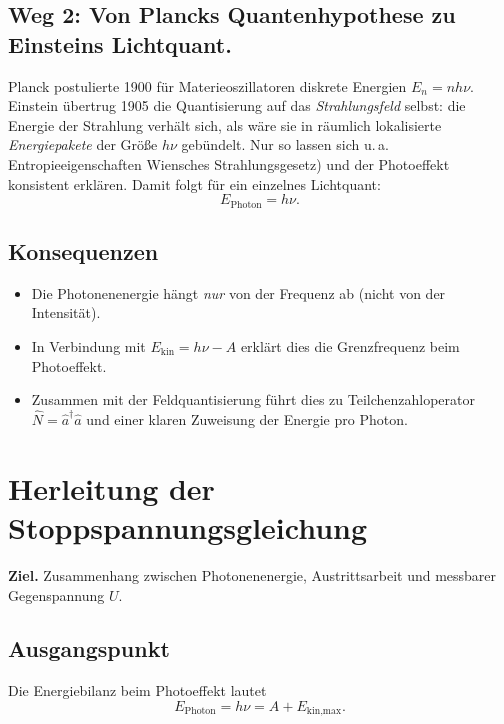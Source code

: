 \subsection*{Weg 2: Von Plancks Quantenhypothese zu Einsteins Lichtquant.}
Planck postulierte 1900 für Materieoszillatoren diskrete Energien \(E_n=n h\nu\).
Einstein übertrug 1905 die Quantisierung auf das \emph{Strahlungsfeld} selbst: die Energie der Strahlung verhält sich, als wäre sie in räumlich lokalisierte \emph{Energiepakete} der Größe \(h\nu\) gebündelt. 
Nur so lassen sich u.\,a. Entropieeigenschaften Wiensches Strahlungsgesetz) und der Photoeffekt konsistent erklären. 
Damit folgt für ein einzelnes Lichtquant:
\[
E_{\text{Photon}} = h\nu.
\]

\subsection*{Konsequenzen}
\begin{itemize}
	\item Die Photonenenergie hängt \emph{nur} von der Frequenz ab (nicht von der Intensität). 
	\item In Verbindung mit \(E_{\text{kin}}=h\nu-A\) erklärt dies die Grenzfrequenz beim Photoeffekt. 
	\item Zusammen mit der Feldquantisierung führt dies zu Teilchenzahloperator \(\hat N=\hat a^\dagger \hat a\) und einer klaren Zuweisung der Energie pro Photon.
\end{itemize}

\section{Herleitung der Stoppspannungsgleichung}
\label{anhangA:stoppspannung}

\textbf{Ziel.} Zusammenhang zwischen Photonenenergie, Austrittsarbeit und messbarer Gegenspannung \(U\).

\subsection*{Ausgangspunkt}
Die Energiebilanz beim Photoeffekt lautet
\[
E_{\text{Photon}} = h\nu = A + E_{\text{kin,max}}.
\]


